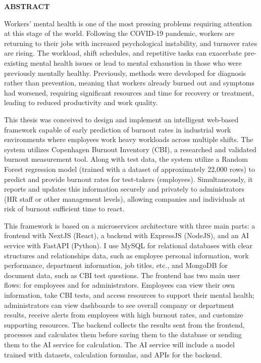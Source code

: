 \documentclass[12pt,a4paper]{article}
\begin{document}

\newpage
\begin{center}
  \textbf{ABSTRACT}
\end{center}

\vspace{1cm}

Workers' mental health is one of the most pressing problems requiring attention at this stage of the world. Following the COVID-19 pandemic, workers are returning to their jobs with increased psychological instability, and turnover rates are rising. The workload, shift schedules, and repetitive tasks can exacerbate pre-existing mental health issues or lead to mental exhaustion in those who were previously mentally healthy. Previously, methods were developed for diagnosis rather than prevention, meaning that workers already burned out and symptoms had worsened, requiring significant resources and time for recovery or treatment, leading to reduced productivity and work quality.

This thesis was conceived to design and implement an intelligent web-based framework capable of early prediction of burnout rates in industrial work environments where employees work heavy workloads across multiple shifts. The system utilizes Copenhagen Burnout Inventory (CBI), a researched and validated burnout measurement tool. Along with test data, the system utilize a Random Forest regression model (trained with a dataset of approximately 22,000 rows) to predict and provide burnout rates for test-takers (employees). Simultaneously, it reports and updates this information securely and privately to administrators (HR staff or other management levels), allowing companies and individuals at risk of burnout sufficient time to react.

This framework is based on a microservices architecture with three main parts: a frontend with NextJS (React), a backend with ExpressJS (NodeJS), and an AI service with FastAPI (Python). I use MySQL for relational databases with clear structures and relationships data, such as employee personal information, work performance, department information, job titles, etc., and MongoDB for document data, such as CBI test questions. The frontend has two main user flows: for employees and for administrators. Employees can view their own information, take CBI tests, and access resources to support their mental health; administrators can view dashboards to see overall company or department results, receive alerts from employees with high burnout rates, and customize supporting resources. The backend collects the results sent from the frontend, processes and calculates them before saving them to the database or sending them to the AI service for calculation. The AI service will include a model trained with datasets, calculation formulas, and APIs for the backend.
\end{document}
